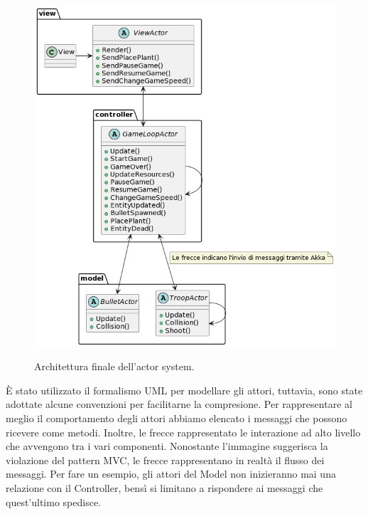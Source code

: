 \begin{figure}[H]
    \centering
    \includegraphics[width=\linewidth]{images/actor-architecture}
    \label{Diagramma delle classi dell'architettura complessiva.}
    \caption{Architettura finale dell'actor system.}
\end{figure}

È stato utilizzato il formalismo UML per modellare gli attori,
tuttavia, sono state adottate alcune convenzioni per facilitarne la compresione.
Per rappresentare al meglio il comportamento degli attori abbiamo elencato i messaggi che possono ricevere come metodi.
Inoltre, le frecce rappresentato le interazione ad alto livello che avvengono tra i vari componenti.
Nonostante l'immagine  suggerisca la violazione del pattern MVC, le frecce rappresentano in realtà il flusso dei messaggi.
Per fare un esempio, gli attori del Model non inizieranno mai una relazione con il Controller,
bensì si limitano a rispondere ai messaggi che quest'ultimo spedisce.
